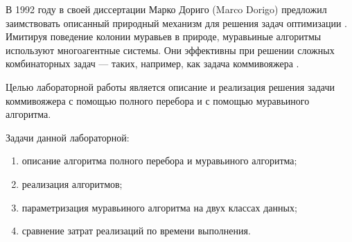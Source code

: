 В 1992 году в своей диссертации Марко Дориго (Marco Dorigo) предложил заимствовать описанный природный механизм для решения задач оптимизации \cite{Dorigo}.
Имитируя поведение колонии муравьев в природе, муравьиные алгоритмы используют многоагентные системы.
Они эффективны при решении сложных комбинаторных задач --- таких, например, как задача коммивояжера \cite{TSPr}.

Целью лабораторной работы является описание и реализация решения задачи коммивояжера с помощью полного перебора и с помощью муравьиного алгоритма.

Задачи данной лабораторной:
\begin{enumerate}
	\item описание алгоритма полного перебора и муравьиного алгоритма;
	\item реализация алгоритмов;
	\item параметризация муравьиного алгоритма на двух классах данных;
	\item сравнение затрат реализаций по времени выполнения.
\end{enumerate}
